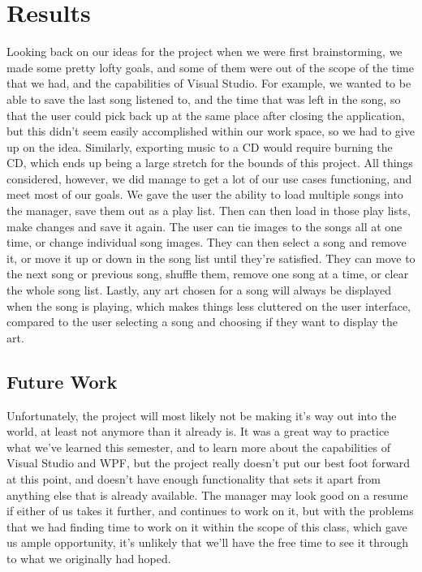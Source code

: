 \documentclass[10pt,conference,onecolumn,compsoc]{IEEEtran}
\begin{document}
\section{Results}
Looking back on our ideas for the project when we were first brainstorming, we made some pretty lofty goals, and some of them were out of the scope of the time that we had, and the capabilities of Visual Studio. For example, we wanted to be able to save the last song listened to, and the time that was left in the song, so that the user could pick back up at the same place after closing the application, but this didn't seem easily accomplished within our work space, so we had to give up on the idea. Similarly, exporting music to a CD would require burning the CD, which ends up being a large stretch for the bounds of this project. All things considered, however, we did manage to get a lot of our use cases functioning, and meet most of our goals. We gave the user the ability to load multiple songs into the manager, save them out as a play list. Then can then load in those play lists, make changes and save it again. The user can tie images to the songs all at one time, or change individual song images. They can then select a song and remove it, or move it up or down in the song list until they're satisfied. They can move to the next song or previous song, shuffle them, remove one song at a time, or clear the whole song list. Lastly, any art chosen for a song will always be displayed when the song is playing, which makes things less cluttered on the user interface, compared to the user selecting a song and choosing if they want to display the art.

\subsection{Future Work}
Unfortunately, the project will most likely not be making it's way out into the world, at least not anymore than it already is. It was a great way to practice what we've learned this semester, and to learn more about the capabilities of Visual Studio and WPF, but the project really doesn't put our best foot forward at this point, and doesn't have enough functionality that sets it apart from anything else that is already available. The manager may look good on a resume if either of us takes it further, and continues to work on it, but with the problems that we had finding time to work on it within the scope of this class, which gave us ample opportunity, it's unlikely that we'll have the free time to see it through to what we originally had hoped.

\end{document}
